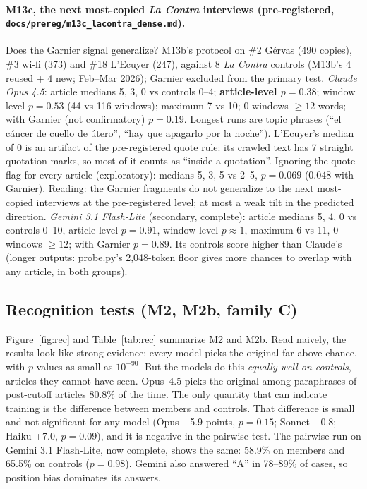 \documentclass[10pt,a4paper]{article}
\begin{document}
\paragraph{M13c, the next most-copied \emph{La Contra} interviews (pre-registered, \texttt{docs/prereg/m13c\_lacontra\_dense.md}).}
Does the Garnier signal generalize? M13b's protocol on \#2 Gérvas (490 copies), \#3 wi-fi (373) and \#18 L'Ecuyer (247),
against 8 \emph{La Contra} controls (M13b's 4 reused + 4 new; Feb--Mar 2026); Garnier excluded from the primary test.
\emph{Claude Opus 4.5}: article medians 5, 3, 0 vs controls 0--4; \textbf{article-level $p=0.38$}; window level $p=0.53$
(44 vs 116 windows); maximum 7 vs 10; 0 windows $\geq 12$ words; with Garnier (not confirmatory) $p=0.19$. Longest runs
are topic phrases (``el cáncer de cuello de útero'', ``hay que apagarlo por la noche''). L'Ecuyer's median of 0 is an
artifact of the pre-registered quote rule: its crawled text has 7 straight quotation marks, so most of it counts as
``inside a quotation''. Ignoring the quote flag for every article (exploratory): medians 5, 3, 5 vs 2--5, $p=0.069$
($0.048$ with Garnier). Reading: the Garnier fragments do not generalize to the next most-copied interviews at the
pre-registered level; at most a weak tilt in the predicted direction. \emph{Gemini 3.1 Flash-Lite} (secondary,
complete): article medians 5, 4, 0 vs controls 0--10, article-level $p=0.91$, window level $p\approx1$, maximum 6 vs 11,
0 windows $\geq 12$; with Garnier $p=0.89$. Its controls score higher than Claude's (longer outputs: probe.py's
2,048-token floor gives more chances to overlap with any article, in both groups).

\subsection{Recognition tests (M2, M2b, family C)}
Figure~\ref{fig:rec} and Table~\ref{tab:rec} summarize M2 and M2b. Read naively, the results look like strong
evidence: every model picks the original far above chance, with $p$-values as small as $10^{-90}$. But the models do
this \emph{equally well on controls}, articles they cannot have seen. Opus~4.5 picks the original among paraphrases of
post-cutoff articles 80.8\% of the time. The only quantity that can indicate training is the difference between
members and controls. That difference is small and not significant for any model (Opus +5.9 points, $p=0.15$;
Sonnet $-0.8$; Haiku +7.0, $p=0.09$), and it is negative in the pairwise test. The pairwise run on Gemini 3.1
Flash-Lite, now complete, shows the same: 58.9\% on members and 65.5\% on controls ($p=0.98$). Gemini also answered
``A'' in 78--89\% of cases, so position bias dominates its answers.
\end{document}
